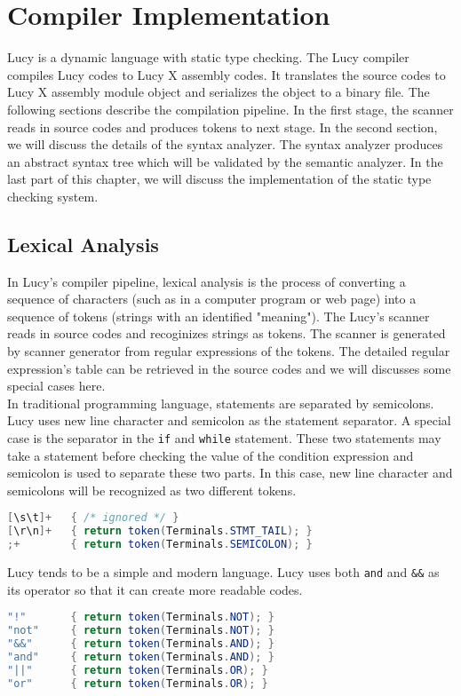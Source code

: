 \chapter{Compiler Implementation}
Lucy is a dynamic language with static type checking. The Lucy compiler compiles Lucy codes to Lucy X assembly codes. It translates the source codes to Lucy X assembly module object and serializes the object to a binary file. The following sections describe the compilation pipeline. In the first stage, the scanner reads in source codes and produces tokens to next stage. In the second section, we will discuss the details of the syntax analyzer. The syntax analyzer produces an abstract syntax tree which will be validated by the semantic analyzer. In the last part of this chapter, we will discuss the implementation of the static type checking system.


\section{Lexical Analysis}
In Lucy's compiler pipeline, lexical analysis is the process of converting a sequence of characters (such as in a computer program or web page) into a sequence of tokens (strings with an identified "meaning"). The Lucy's scanner reads in source codes and recoginizes strings as tokens. The scanner is generated by scanner generator from regular expressions of the tokens. The detailed regular expression's table can be retrieved in the source codes and we will discusses some special cases here. \\
In traditional programming language, statements are separated by semicolons. Lucy uses new line character and semicolon as the statement separator. A special case is the separator in the \texttt{if} and \texttt{while} statement. These two statements may take a statement before checking the value of the condition expression and semicolon is used to separate these two parts. In this case, new line character and semicolons will be recognized as two different tokens.
\begin{lstlisting}[language=java]
[\s\t]+   { /* ignored */ }
[\r\n]+   { return token(Terminals.STMT_TAIL); }
;+        { return token(Terminals.SEMICOLON); }
\end{lstlisting}
Lucy tends to be a simple and modern language. Lucy uses both \texttt{and} and \texttt{\&\&} as its operator so that it can create more readable codes.
\begin{lstlisting}[language=java]
"!"       { return token(Terminals.NOT); }
"not"     { return token(Terminals.NOT); }
"&&"      { return token(Terminals.AND); }
"and"     { return token(Terminals.AND); }
"||"      { return token(Terminals.OR); }
"or"      { return token(Terminals.OR); }
\end{lstlisting}


